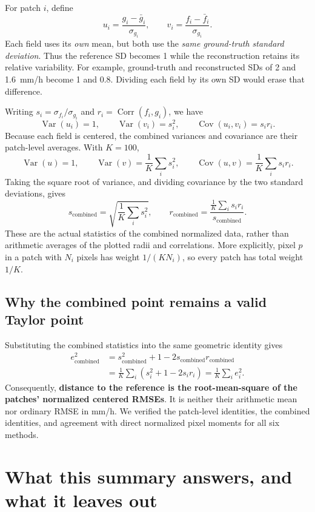 \documentclass[11pt,a4paper]{article}
\newcommand{\Var}{\operatorname{Var}}
\newcommand{\Cov}{\operatorname{Cov}}
\newcommand{\Corr}{\operatorname{Corr}}
\begin{document}
For patch $i$, define
\[
u_i=\frac{g_i-\bar g_i}{\sigma_{g_i}},\qquad
v_i=\frac{f_i-\bar f_i}{\sigma_{g_i}}.
\]
Each field uses its \emph{own} mean, but both use the \emph{same ground-truth standard deviation}. Thus the reference SD becomes 1 while the reconstruction retains its relative variability. For example, ground-truth and reconstructed SDs of 2 and 1.6~mm/h become 1 and 0.8. Dividing each field by its own SD would erase that difference.

Writing $s_i=\sigma_{f_i}/\sigma_{g_i}$ and $r_i=\Corr(f_i,g_i)$, we have
\[
\Var(u_i)=1,\qquad \Var(v_i)=s_i^2,\qquad \Cov(u_i,v_i)=s_i r_i.
\]
Because each field is centered, the combined variances and covariance are their patch-level averages. With $K=100$,
\[
\Var(u)=1,\qquad
\Var(v)=\frac1K\sum_i s_i^2,\qquad
\Cov(u,v)=\frac1K\sum_i s_i r_i.
\]
Taking the square root of variance, and dividing covariance by the two standard deviations, gives
\[
\boxed{s_{\mathrm{combined}}=\sqrt{\frac1K\sum_i s_i^2}},
\qquad
\boxed{r_{\mathrm{combined}}=
\frac{\frac1K\sum_i s_i r_i}{s_{\mathrm{combined}}}}.
\]
These are the actual statistics of the combined normalized data, rather than arithmetic averages of the plotted radii and correlations. More explicitly, pixel $p$ in a patch with $N_i$ pixels has weight $1/(KN_i)$, so every patch has total weight $1/K$.

\subsection*{Why the combined point remains a valid Taylor point}
Substituting the combined statistics into the same geometric identity gives
\begin{align*}
e_{\mathrm{combined}}^2
 &=s_{\mathrm{combined}}^2+1
   -2s_{\mathrm{combined}}r_{\mathrm{combined}}\\
 &=\frac1K\sum_i\left(s_i^2+1-2s_i r_i\right)
 =\frac1K\sum_i e_i^2.
\end{align*}
Consequently, \textbf{distance to the reference is the root-mean-square of the patches' normalized centered RMSEs}. It is neither their arithmetic mean nor ordinary RMSE in mm/h. We verified the patch-level identities, the combined identities, and agreement with direct normalized pixel moments for all six methods.

\newpage
\section*{What this summary answers, and what it leaves out}
\end{document}

